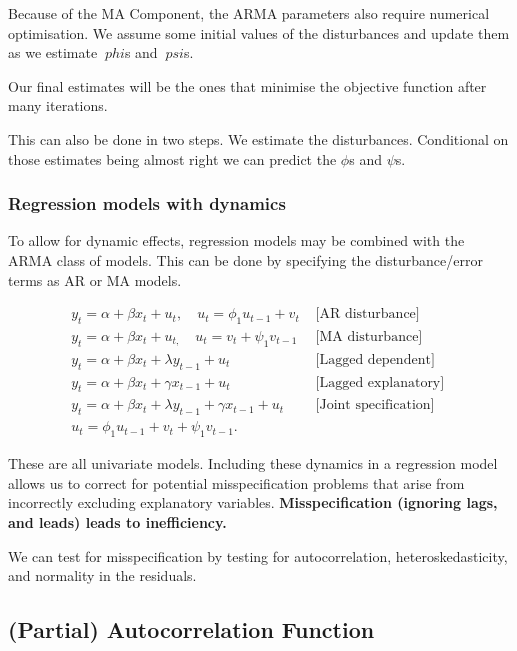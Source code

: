 \documentclass[11pt]{article}
\begin{document}
Because of the MA Component, the ARMA parameters also require numerical optimisation. We assume some initial values of the disturbances and update them as we estimate $\ phi$s and $\ psi$s.

Our final estimates will be the ones that minimise the objective function after many iterations.
\begin{note}
    This can also be done in two steps. We estimate the disturbances. Conditional on those estimates being almost right we can predict the $\phi$s and $\psi$s.
\end{note}

\subsubsection{Regression models with dynamics}

To allow for dynamic effects, regression models may be combined with the ARMA class of models. This can be done by specifying the disturbance/error terms as AR or MA models.

\begin{align*}
    y_t=\alpha+\beta x_t+u_t, \quad u_t=\phi_1 u_{t-1}+v_t & \text { [AR disturbance] } \\
    y_t=\alpha+\beta x_t+u_{t,} \quad u_t=v_t+\psi_1 v_{t-1} & \text { [MA disturbance] } \\
    y_t=\alpha+\beta x_t+\lambda y_{t-1}+u_t & \text { [Lagged dependent] } \\
    y_t=\alpha+\beta x_t+\gamma x_{t-1}+u_t & \text { [Lagged explanatory] } \\
    y_t=\alpha+\beta x_t+\lambda y_{t-1}+\gamma x_{t-1}+u_t & \text { [Joint specification] } \\
    u_t=\phi_1 u_{t-1}+v_t+\psi_1 v_{t-1} . &
\end{align*}

These are all univariate models. Including these dynamics in a regression model allows us to correct for potential misspecification problems that arise from incorrectly excluding explanatory variables. \textbf{Misspecification (ignoring lags, and leads) leads to inefficiency.}


We can test for misspecification by testing for autocorrelation, heteroskedasticity, and normality in the residuals.

\subsection{(Partial) Autocorrelation Function}
\end{document}
